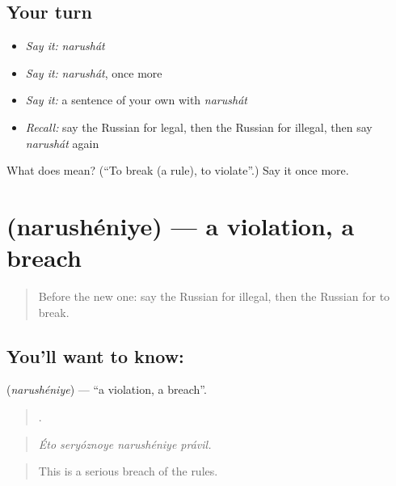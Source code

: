\subsection*{Your turn}
\begin{itemize}
\raggedright
  \item \emph{Say it:} \emph{narushát}
  \item \emph{Say it:} \emph{narushát}, once more
  \item \emph{Say it:} a sentence of your own with \emph{narushát}
  \item \emph{Recall:} say the Russian for legal, then the Russian for illegal, then say \emph{narushát} again
\end{itemize}

\begin{tcolorbox}[breakable,colback=teal!4,colframe=teal!35!black,title={Before you move on}]
What does  mean? (\textquotedblleft{}To break (a rule), to violate\textquotedblright{}.) Say it once more.
\end{tcolorbox}
\section[\texorpdfstring{\ru{нарушение} (narushéniye)}{нарушение (narushéniye)}]{ (narushéniye) — a violation, a breach}

\label{lesson:RU-C388-narushenie}



\begin{quote}
Before the new one: say the Russian for illegal, then the Russian for to break.
\end{quote}

\subsection*{You'll want to know: }
\textbf{} (\emph{narushéniye}) — \textquotedblleft{}a violation, a breach\textquotedblright{}.

\begin{quote}
   .
\end{quote}

\begin{quote}
\emph{Éto seryóznoye narushéniye právil.}
\end{quote}

\begin{quote}
This is a serious breach of the rules.
\end{quote}


